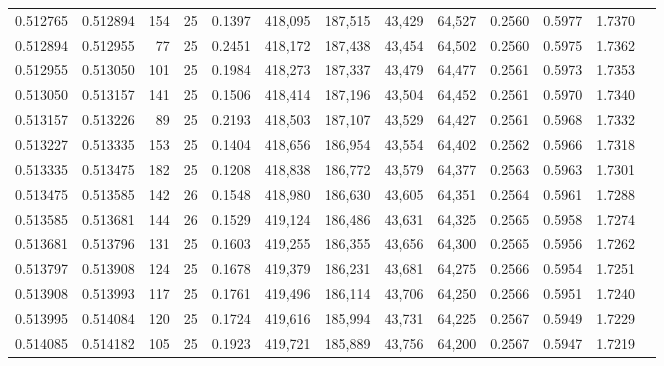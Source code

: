 \begin{tabular}{rrrrrrrrrrrrr}
0.512765 & 0.512894 &   154 &  25 &                                     0.1397 & 418,095 & 187,515 &  43,429 &  64,527 & 0.2560 & 0.5977 & 1.7370 \\
0.512894 & 0.512955 &    77 &  25 &                                     0.2451 & 418,172 & 187,438 &  43,454 &  64,502 & 0.2560 & 0.5975 & 1.7362 \\
0.512955 & 0.513050 &   101 &  25 &                                     0.1984 & 418,273 & 187,337 &  43,479 &  64,477 & 0.2561 & 0.5973 & 1.7353 \\
0.513050 & 0.513157 &   141 &  25 &                                     0.1506 & 418,414 & 187,196 &  43,504 &  64,452 & 0.2561 & 0.5970 & 1.7340 \\
0.513157 & 0.513226 &    89 &  25 &                                     0.2193 & 418,503 & 187,107 &  43,529 &  64,427 & 0.2561 & 0.5968 & 1.7332 \\
0.513227 & 0.513335 &   153 &  25 &                                     0.1404 & 418,656 & 186,954 &  43,554 &  64,402 & 0.2562 & 0.5966 & 1.7318 \\
0.513335 & 0.513475 &   182 &  25 &                                     0.1208 & 418,838 & 186,772 &  43,579 &  64,377 & 0.2563 & 0.5963 & 1.7301 \\
0.513475 & 0.513585 &   142 &  26 &                                     0.1548 & 418,980 & 186,630 &  43,605 &  64,351 & 0.2564 & 0.5961 & 1.7288 \\
0.513585 & 0.513681 &   144 &  26 &                                     0.1529 & 419,124 & 186,486 &  43,631 &  64,325 & 0.2565 & 0.5958 & 1.7274 \\
0.513681 & 0.513796 &   131 &  25 &                                     0.1603 & 419,255 & 186,355 &  43,656 &  64,300 & 0.2565 & 0.5956 & 1.7262 \\
0.513797 & 0.513908 &   124 &  25 &                                     0.1678 & 419,379 & 186,231 &  43,681 &  64,275 & 0.2566 & 0.5954 & 1.7251 \\
0.513908 & 0.513993 &   117 &  25 &                                     0.1761 & 419,496 & 186,114 &  43,706 &  64,250 & 0.2566 & 0.5951 & 1.7240 \\
0.513995 & 0.514084 &   120 &  25 &                                     0.1724 & 419,616 & 185,994 &  43,731 &  64,225 & 0.2567 & 0.5949 & 1.7229 \\
0.514085 & 0.514182 &   105 &  25 &                                     0.1923 & 419,721 & 185,889 &  43,756 &  64,200 & 0.2567 & 0.5947 & 1.7219 \\

\end{tabular}
